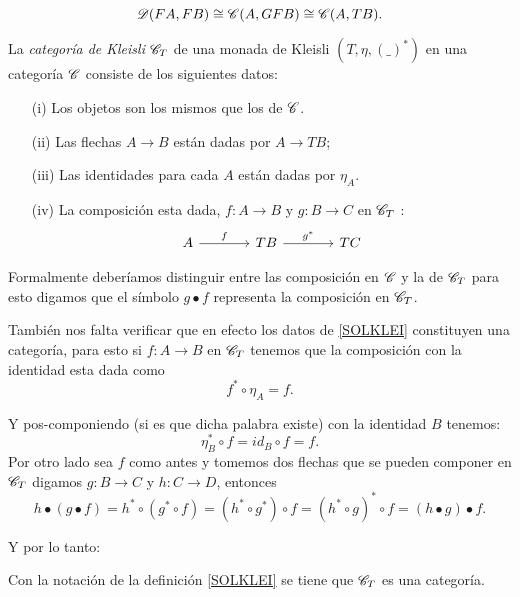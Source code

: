 \documentclass{comunicaciones}
\begin{document}
\[\EuScript{D}(FA,FB)\cong\EuScript{C}(A,GFB)\cong\EuScript{C}(A,TB).\]
 \begin{dfn}\label{cate de Kleisli}
La \emph{categoría de Kleisli} $\EuScript{C}_{T}$ de una monada de Kleisli $(T,\eta,(\_)^{*})$ en una categoría $\EuScript{C}$ consiste de los siguientes datos:
\begin{itemize}
\item[(i)] Los objetos son los mismos que los de $\EuScript{C}$.
\item[(ii)] Las flechas $A\rightarrow B$ están dadas por $A\rightarrow TB$;
\item[(iii)] Las identidades para cada $A$ están dadas por $\eta_{A}$.
\item[(iv)] La composición esta dada, $f\colon A\rightarrow B$  y $g\colon B\rightarrow C$ en $\EuScript{C}_{T}$ : \[\begin{tikzcd}[column sep=large, row sep=large]
    A \arrow[r, "f"]  & TB \arrow[r, "g^{*}"] & TC
    \end{tikzcd}\]
\end{itemize}
Formalmente deberíamos distinguir entre las composición en $\EuScript{C}$ y la de $\EuScript{C}_{T}$ para esto digamos que el símbolo $g\bullet f$ representa la composición en $\EuScript{C}_{T}$.

También nos falta verificar que en efecto los datos de \ref{SOLKLEI} constituyen una categoría, para esto si $f\colon A\rightarrow B$ en $\EuScript{C}_{T}$ tenemos que la composición con la identidad esta dada como \[f^{*}\circ\eta_{A}=f.\]

Y pos-componiendo (si es que dicha palabra existe) con la identidad $B$ tenemos: \[\eta^{*}_{B}\circ f=id_{B}\circ f=f.\]
Por otro lado sea $f$ como antes y tomemos dos flechas que se pueden componer en $\EuScript{C}_{T}$ digamos $g\colon B\rightarrow C$ y $h\colon C\rightarrow D$, entonces \[h\bullet (g\bullet f)=h^{*}\circ(g^{*}\circ f)=(h^{*}\circ g^{*})\circ f=(h^{*}\circ g)^{*}\circ f=(h\bullet g)\bullet f.\]
\end{dfn}

Y por lo tanto:

\begin{prop}\label{catkleisliesunacat}
Con la notación de la definición \ref{SOLKLEI} se tiene que $\EuScript{C}_{T}$ es una categoría.
\end{prop}
\end{document}

